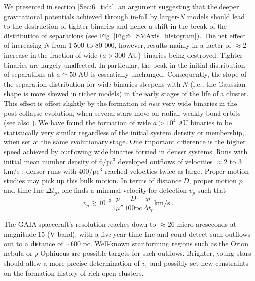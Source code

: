 We presented in section \ref{Sec:6_tidal} an argument suggesting that the deeper gravitational potentials achieved through in-fall by larger-$N$ models should lead to the destruction of tighter binaries and hence a shift in the break of the distribution of separations (see Fig. \ref{Fig:6_SMAxis_histogram}). The net effect of increasing $N$ from 1 500 to 80 000, however, results mainly in a factor of $\approx 2$ increase in the fraction of wide $(a > 300 $ AU) binaries being destroyed. Tighter binaries are largely unaffected. In particular, the peak in the initial distribution of separations at $a \simeq 50 $ AU is essentially unchanged. Consequently,   the slope of the separation distribution for wide binaries steepens with $N$ (i.e., the Gaussian shape is more skewed in richer models) in the early stages of the life of a cluster.  This effect is offset slightly  by the formation of \textit{new} very wide binaries in the post-collapse evolution, when several stars move on radial, weakly-bond orbits (see also \citealt{Moeckel2011,Kouwenhoven2010}). We have found the formation of wide $a > 10^4$ AU binaries to be statistically very similar regardless of the initial system density or membership, when set at the same evolutionary stage. One important difference is the higher speed achieved by outflowing wide binaries formed in denser systems. Runs with initial mean number density of $6 / \mathrm{pc}^3 $ developed outflows of velocities $\approx 2$ to 3 km/s ; denser runs with $400 / \mathrm{pc}^3$ reached velocities twice as large. Proper motion studies may pick up this bulk motion. In terms of distance $D$, proper motion $p$ and time-line $\Delta t_p$, one finds a minimal velocity for detection $v_p$ such that 
\begin{equation}
v_p \gtrsim 10^{-3}  \frac{p}{1\mu ''} \frac{D}{100 \mathrm{pc}} \frac{yr}{\Delta t_p} \mathrm{km}/\mathrm{s} \  .
\end{equation}

  The GAIA spacecraft's resolution reaches down to $\approx 26$ micro-arcseconds  at magnitude 15 (V-band), 
 with a five-year time-line and could detect such outflows out to  a distance of $\sim 600 $  pc. Well-known star forming  regions such as the Orion nebula or $\rho$-Ophiucus are possible targets for such outflows. Brighter, young stars  should allow a more precise determination of $v_p$ and possibly set new constraints on the formation history of rich open clusters. 

